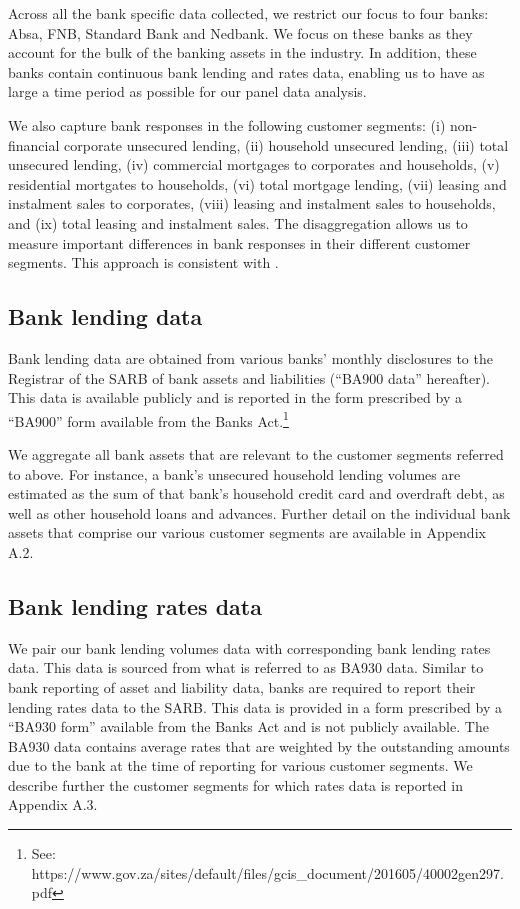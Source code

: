 \documentclass[
  letterpaper,
  DIV=11,
  numbers=noendperiod]{scrartcl}
\begin{document}
Across all the bank specific data collected, we restrict our focus to
four banks: Absa, FNB, Standard Bank and Nedbank. We focus on these
banks as they account for the bulk of the banking assets in the
industry. In addition, these banks contain continuous bank lending and
rates data, enabling us to have as large a time period as possible for
our panel data analysis.

We also capture bank responses in the following customer segments: (i)
non-financial corporate unsecured lending, (ii) household unsecured
lending, (iii) total unsecured lending, (iv) commercial mortgages to
corporates and households, (v) residential mortgates to households, (vi)
total mortgage lending, (vii) leasing and instalment sales to
corporates, (viii) leasing and instalment sales to households, and (ix)
total leasing and instalment sales. The disaggregation allows us to
measure important differences in bank responses in their different
customer segments. This approach is consistent with \citet{sibande2024}.

\subsection{Bank lending data}\label{bank-lending-data}

Bank lending data are obtained from various banks' monthly disclosures
to the Registrar of the SARB of bank assets and liabilities (``BA900
data'' hereafter). This data is available publicly and is reported in
the form prescribed by a ``BA900'' form available from the Banks
Act.\footnote{See:
  https://www.gov.za/sites/default/files/gcis\_document/201605/40002gen297.pdf}

We aggregate all bank assets that are relevant to the customer segments
referred to above. For instance, a bank's unsecured household lending
volumes are estimated as the sum of that bank's household credit card
and overdraft debt, as well as other household loans and advances.
Further detail on the individual bank assets that comprise our various
customer segments are available in Appendix A.2.

\subsection{Bank lending rates data}\label{bank-lending-rates-data}

We pair our bank lending volumes data with corresponding bank lending
rates data. This data is sourced from what is referred to as BA930 data.
Similar to bank reporting of asset and liability data, banks are
required to report their lending rates data to the SARB. This data is
provided in a form prescribed by a ``BA930 form'' available from the
Banks Act and is not publicly available. The BA930 data contains average
rates that are weighted by the outstanding amounts due to the bank at
the time of reporting for various customer segments. We describe further
the customer segments for which rates data is reported in Appendix A.3.
\end{document}

